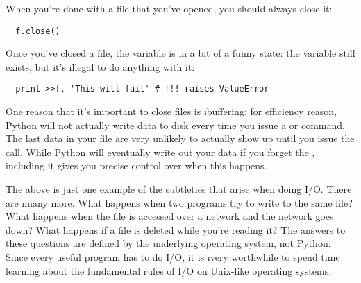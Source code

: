 \documentclass[letterpaper, 12pt, titlepage, twoside]{article}
\begin{document}
When you're done with a file that you've opened, you should always close it:

\begin{lstlisting}
  f.close()
\end{lstlisting}

Once you've closed a file, the  variable is in a bit of a funny state:
the variable still exists, but it's illegal to do anything with it:

\begin{lstlisting}
  print >>f, 'This will fail' # !!! raises ValueError
\end{lstlisting}

One reason that it's important to close files is \i{buffering}: for efficiency
reason, Python will not actually write data to disk every time you issue a
 or  command. The last data in your file are very unlikely
to actually show up until you issue the  call. While Python will
eventually write out your data if you forget the , including it
gives you precise control over when this happens.

The above is just one example of the subtleties that arise when doing I/O.
There are \i{many} more. What happens when two programs try to write to the
same file? What happens when the file is accessed over a network and the
network goes down? What happens if a file is deleted while you're reading it?
The answers to these questions are defined by the underlying operating system,
not Python. Since every useful program has to do I/O, it is \i{very}
worthwhile to spend time learning about the fundamental rules of I/O on
Unix-like operating systems.
\end{document}
